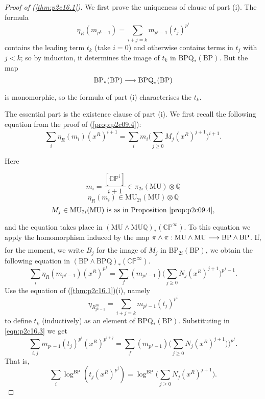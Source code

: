 \documentclass[../main]{subfiles}
\begin{document}
\begin{proof}[Proof of (\ref{thm:p2c16.1})]
We first prove the uniqueness of clause of part (i). The formula \[\eta_R (m_{p^k - 1}) = \sum_{i + j = k} m_{p^i - 1} (t_j)^{p^i}\] contains the leading term $t_k$ (take $i = 0$) and otherwise contains terms in $t_j$ with $j < k$; so by induction, it determines the image of $t_k$ in $\mathrm {BPQ}_\ast(\mathrm {BP})$. But the map \[\mathrm {BP}_\ast(\mathrm {BP}) \lar{} \mathrm{BPQ}_\ast(\mathrm{BP})\] is monomorphic, so the formula of part (i) characterises the $t_k$. 

The essential part is the existence clause of part (i). We first recall the following equation from the proof of (\ref{prop:p2c09.4}): 
\begin{equation}
\tag{16.2}
\label{eqn:p2c16.2}
\sum_i \eta_R (m_i) (x^R)^{i + 1} = \sum_i m_i \bigg(\sum_{j \ge 0} M_j (x^R)^{j + 1}\bigg)^{i + 1}.
\end{equation}

Here

\[m_i = \frac {[\mathbb {CP}^i]} {i + 1} \in \pi_{2i} (\mathrm {MU}) \otimes \mathbb Q\]
\[\eta_R(m_i) \in \mathrm{MU}_{2i}(\mathrm{MU}) \otimes \mathbb Q\]
\[M_j \in \mathrm{MU}_{2i}(\mathrm{MU}) \text { is as in Proposition } \ref{prop:p2c09.4},\]

and the equation takes place in $(\mathrm {MU} \wedge \mathrm {MU} \mathbb Q)_\ast(\mathbb {CP}^\infty)$. To this equation we apply the homomorphism induced by the map $\pi \wedge \pi : \mathrm {MU} \wedge \mathrm{MU} \lar{} \mathrm{BP} \wedge \mathrm{BP}$. If, for the moment, we write $B_j$ for the image of $M_j$ in $\mathrm {BP}_{2i} (\mathrm {BP})$, we obtain the following equation in $(\mathrm {BP} \wedge \mathrm {BPQ})_\ast (\mathbb {CP}^\infty)$.
\begin{equation}
\tag{16.3}
\label{eqn:p2c16.3}
\sum_i \eta_R (m_{p^f - 1}) (x^R)^{p^f} = \sum_f (m_{p^f - 1}) \Big(\sum_{j \ge 0} N_j (x^R)^{j + 1}\Big)^{p^f - 1}.
\end{equation}
Use the equation of (\ref{thm:p2c16.1})(i), namely \[\eta_{R^m_{p^k - 1}} = \sum_{i + j = k} m_{p^i - 1} (t_j)^{p^i}\] to define $t_k$ (inductively) as an element of $\mathrm {BPQ}_*(\mathrm {BP})$. Substituting in \eqref{eqn:p2c16.3} we get \[\sum_{i, j} m_{p^i - 1} (t_j)^{p^i} (x^R)^{p^{i + j}} = \sum_f (m_{p^f - 1}) \Big(\sum_{j \ge 0} N_j (x^R)^{j + 1})\Big)^{p^f}.\] 
That is, \[\sum_i \log^{\mathrm{BP}} (t_j (x^R)^{p^j}) = \log^{\mathrm{BP}} \Big(\sum_{j \ge 0} N_j (x^R)^{j + 1}\Big).\]


\end{proof}
\end{document}

